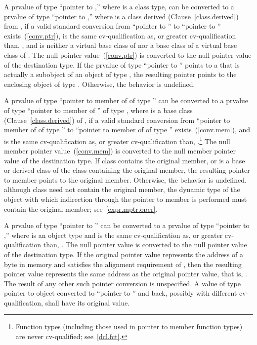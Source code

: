 \pnum
{}%
%
A prvalue of type ``pointer to  ,'' where 
is a class type, can be converted to a prvalue of type ``pointer to
 ,'' where  is a class derived
(Clause~\ref{class.derived}) from , if a valid standard
conversion from ``pointer to '' to ``pointer to ''
exists~(\ref{conv.ptr}),  is the same cv-qualification as,
or greater cv-qualification than, , and  is neither
a virtual base class of  nor a base class of a virtual base
class of . The null pointer value~(\ref{conv.ptr}) is converted
to the null pointer value of the destination type. If the prvalue of type
``pointer to  '' points to a  that is
actually a subobject of an object of type , the resulting
pointer points to the enclosing object of type . Otherwise, the
behavior is undefined.

\pnum
{}%
A prvalue of type ``pointer to member of  of type 
'' can be converted to a prvalue of type ``pointer to member of
'' of type  , where  is a base
class (Clause~\ref{class.derived}) of , if a valid standard
conversion from ``pointer to member of  of type '' to
``pointer to member of  of type ''
exists~(\ref{conv.mem}), and  is the same cv-qualification
as, or greater cv-qualification than, .\footnote{Function types
(including those used in pointer to member function
types) are never cv-qualified; see~\ref{dcl.fct}.}
The null member pointer value~(\ref{conv.mem}) is converted to the null
member pointer value of the destination type. If class 
contains the original member, or is a base or derived class of the class
containing the original member, the resulting pointer to member points
to the original member. Otherwise, the behavior is undefined.
\enternote 
although class  need not contain the original member, the
dynamic type of the object with which indirection through the pointer
to member is performed must contain the original member;
see~\ref{expr.mptr.oper}.
\exitnote 

\pnum
A prvalue of type ``pointer to  '' can be
converted to a prvalue of type ``pointer to  ,''
where  is an object type and  is the same
cv-qualification as, or greater cv-qualification than, . The
null pointer value is converted to the null pointer value of the
destination type. If the original pointer value represents the address
 of a byte in memory and  satisfies the alignment
requirement of , then the resulting pointer value represents the same
address as the original pointer value, that is, . The result of any
other such pointer conversion is unspecified.
A value of type pointer to object converted to
``pointer to  '' and back, possibly with
different cv-qualification, shall have its original value.
\enterexample

